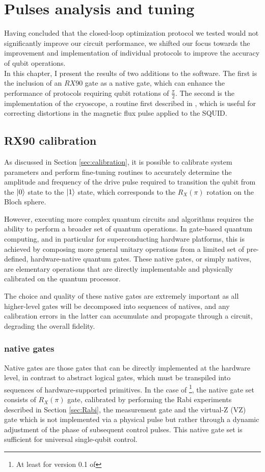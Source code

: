 \chapter{Pulses analysis and tuning}

Having concluded that the closed-loop optimization protocol we tested would not significantly improve our circuit performance, we shifted our focus towards the improvement and implementation of individual protocols to improve the accuracy of qubit operations.\\
In this chapter, I present the results of two additions to the \Qibocal software. 
The first is the inclusion of an $RX90$ gate as a native gate, which can enhance the performance of protocols requiring qubit rotations of $\frac{\pi}{2}$.
The second is the implementation of the cryoscope, a routine first described in \cite{rol_time-domain_2020}, which is useful for correcting distortions in the magnetic flux pulse applied to the SQUID.

\section{RX90 calibration}
As discussed in Section \ref{sec:calibration}, it is possible to calibrate system parameters and perform fine-tuning routines to accurately determine the amplitude and frequency of the drive pulse required to transition the qubit from the $\ket{0}$ state to the $\ket{1}$ state, which corresponds to the $R_X(\pi)$ rotation on the Bloch sphere.

However, executing more complex quantum circuits and algorithms requires the ability to perform a broader set of quantum operations. 
In gate-based quantum computing, and in particular for superconducting hardware platforms, this is achieved by composing more general unitary operations from a limited set of pre-defined, hardware-native quantum gates. 
These native gates, or simply natives, are elementary operations that are directly implementable and physically calibrated on the quantum processor.

The choice and quality of these native gates are extremely important as all higher-level gates will be decomposed into sequences of natives, and any calibration errors in the latter can accumulate and propagate through a circuit, degrading the overall fidelity. 

\subsection{\Qibolab native gates}\label{subsec:native_gates}
Native gates are those gates that can be directly implemented at the hardware level, in contrast to abstract logical gates, which must be transpiled into sequences of hardware-supported primitives. 
In the case of \Qibolab \footnote{At least for version 0.1 of \Qibolab}, the native gate set consists of $R_X(\pi)$ gate, calibrated by performing the Rabi experiments described in Section \ref{sec:Rabi}, the measurement gate and the virtual-Z (VZ) gate which is not implemented via a physical pulse but rather through a dynamic adjustment of the phase of subsequent control pulses. 
This native gate set is sufficient for universal single-qubit control.

